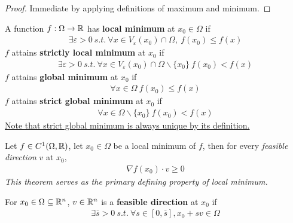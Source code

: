 \documentclass{article}
\begin{document}
    \begin{proof}
    	Immediate by applying definitions of maximum and minimum.
    \end{proof}
   	
   	\begin{definition}
   		A function $f: \Omega \to \mathbb{R}$ has \textbf{local minimum} at $x_0 \in \Omega$ if
   		\begin{align}
   			\exists \varepsilon > 0\ s.t.\ \forall x \in V_\varepsilon(x_0) \cap \Omega,\  f(x_0) \leq f(x)
   		\end{align}
   		$f$ attains \textbf{strictly local minimum} at $x_0$ if
   		\begin{align}
   			\exists \varepsilon > 0\ s.t.\ \forall x \in V_\varepsilon(x_0) \cap \Omega \backslash \{x_0\}\ f(x_0) < f(x)
   		\end{align}
   		$f$ attains \textbf{global minimum} at $x_0$ if
   		\begin{align}
   			\forall x \in \Omega\ f(x_0) \leq f(x)
   		\end{align}
   		$f$ attains \textbf{strict global minimum} at $x_0$ if
   		\begin{align}
   			\forall x \in \Omega \backslash \{x_0\} \ f(x_0) < f(x)
   		\end{align}
   		\ul{Note that strict global minimum is always unique by its definition.}
   	\end{definition}
   	
   	\begin{theorem}
   		Let $f \in C^1(\Omega, \mathbb{R})$, let $x_0 \in \Omega$ be a local minimum of $f$, then for every \emph{feasible direction} $v$ at $x_0$,
   		\begin{align}
   			\nabla f(x_0) \cdot v \geq 0
   		\end{align}
   		\emph{This theorem serves as the primary defining property of local minimum.}
   	\end{theorem}
   	
   	\begin{definition}
   		For $x_0 \in \Omega \subseteq \mathbb{R}^n$,  $v \in \mathbb{R}^n$ is a \textbf{feasible direction} at $x_0$ if
   		\begin{align}
   			\exists \overline{s} > 0\ s.t.\ \forall s \in [0, \overline{s}], x_0 + s v \in \Omega
   		\end{align}
   	\end{definition}
   	
\end{document}
